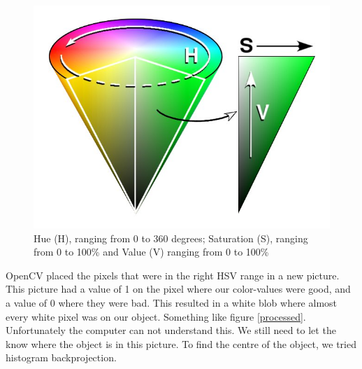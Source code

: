\begin{figure}
  \centering
      \includegraphics[scale=0.35]{HSV.jpg}
  \caption{Hue (H), ranging from 0 to 360 degrees; Saturation (S), ranging from 0 to 100\% and Value (V) ranging from 0 to 100\% }
  \label{HSV}
\end{figure}

OpenCV placed the pixels that were in the right HSV range in a new picture. This
picture had a value of 1 on the pixel where our color-values were good, and a
value of 0 where they were bad. This resulted in a white blob where almost every
white pixel was on our object. Something like figure \ref{processed}.
Unfortunately the computer can not understand this. We still need to let the
\Ardrone know where the object is in this picture. To find the centre of the
object, we tried histogram backprojection.


